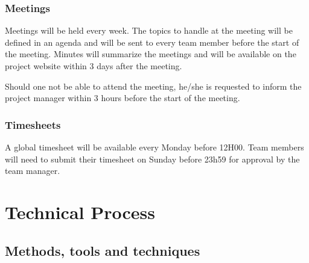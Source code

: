 \documentclass[a4paper, 12pt]{report}
\begin{document}
			\subsection{Meetings}
			Meetings will be held every week. The topics to handle at the meeting will be defined
			in an agenda and will be sent to every team member before the start of the
			meeting. Minutes will summarize the meetings and will be available on the project 
			website within 3 days after the meeting.
			
			Should one not be able to attend the meeting, he/she is requested to inform
			the project manager within 3 hours before the start of the meeting.
			
			\subsection{Timesheets}
			A global timesheet will be available every Monday before 12H00. Team 
			members will need to submit their timesheet on Sunday before 23h59
			for approval by the team manager.
			
	\chapter{Technical Process}
	
			\section{Methods, tools and techniques}
			
\end{document}
